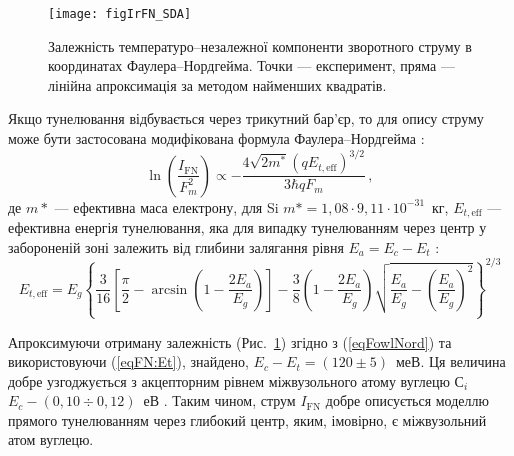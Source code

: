\begin{figure}
\center
\texttt{[image: figIrFN\_SDA]}
\caption{\label{figIrFN_SDA}
Залежність температуро--незалежної компоненти зворотного струму
в координатах Фаулера--Нордгейма.
Точки --- експеримент, пряма --- лінійна апроксимація за методом найменших квадратів.
}%
\end{figure}

Якщо тунелювання відбувається через трикутний бар'єр, то для опису струму може бути застосована
модифікована формула Фаулера--Нордгейма  \cite{Rhoderick1988,Novikov,Kurnosova}:
\begin{equation}\label{eqFowlNord}
    \ln\left(\frac{I_\mathrm{FN}}{F_m^2}\right)\propto -\frac{4 \sqrt{2m^*}(qE_{t,\mathrm{eff}})^{3/2}}{3\hbar q F_m}\,,
\end{equation}
де
$m*$ ---  ефективна маса електрону,
для Si $m* = 1,08\cdot9,11\cdot10^{-31}$~кг,
$E_{t,\mathrm{eff}}$ --– ефективна енергія тунелювання,
яка для випадку тунелюванням через центр у забороненій зоні залежить від глибини залягання рівня $E_a=E_c-E_t$ \cite{Kurnosova,Bulyarskii2001r}:
\begin{equation}\label{eqFN:Et}
    E_{t,\mathrm{eff}}=E_g\left\{\frac{3}{16}\left[\frac{\pi}{2}-
     \arcsin\left(1-\frac{2E_a}{E_g}\right)\right]-\frac{3}{8}\left(1-\frac{2E_a}{E_g}\right)
     \sqrt{\frac{E_a}{E_g}-\left(\frac{E_a}{E_g}\right)^2}\right\}^{2/3}
\end{equation}


Апроксимуючи отриману залежність (Рис.~\ref{figIrFN_SDA}) згідно з (\ref{eqFowlNord}) та використовуючи (\ref{eqFN:Et}),
знайдено, $E_c-E_t=(120\pm5)$~меВ.
Ця величина добре узгоджується з акцепторним рівнем міжвузольного атому вуглецю С$_i$ $E_c-(0,10\div0,12)$~еВ \cite{Vavilov1990r,Song1987}.
Таким чином, струм $I_\mathrm{FN}$ добре описується моделлю прямого тунелюванням через глибокий центр, яким, імовірно, є міжвузольний атом вуглецю.

